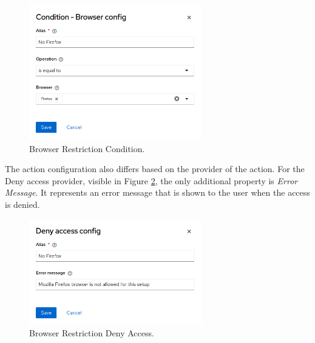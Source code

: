 \begin{figure}[htbp]
  \centering
  \includegraphics[width=0.67\textwidth]{img/sections/5-design/policy-browser-condition.png}
  \caption{Browser Restriction Condition.}
  \label{fig:design-policy-browser-flow-condition}
\end{figure}

The action configuration also differs based on the provider of the action.
For the Deny access provider, visible in Figure \ref{fig:design-policy-browser-flow-deny}, the only additional property is \textit{Error Message}.
It represents an error message that is shown to the user when the access is denied.

\begin{figure}[htbp]
  \centering
  \includegraphics[width=0.67\textwidth]{img/sections/5-design/policy-browser-deny.png}
  \caption{Browser Restriction Deny Access.}
  \label{fig:design-policy-browser-flow-deny}
\end{figure}

\newpage
